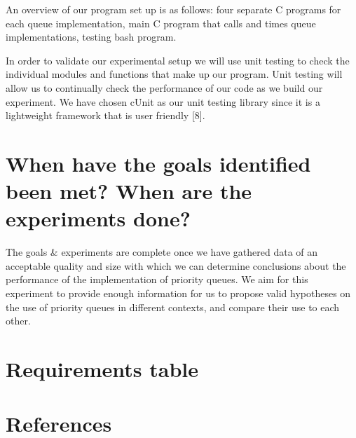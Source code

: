 \documentclass[12pt]{article}
\begin{document}
An overview of our program set up is as follows:  four separate C programs for each queue implementation, main C program that calls and times queue implementations, testing bash program.

In order to validate our experimental setup we will use unit testing to check the individual modules and functions that make up our program. Unit testing will allow us to continually check the performance of our code as we build our experiment. We have chosen cUnit as our unit testing library since it is a lightweight framework that is user friendly [8].


\section{When have the goals identified been met? When are the experiments done?}

The goals \& experiments are complete once we have gathered data of an acceptable quality and size with which we can determine conclusions about the performance of the implementation of priority queues. We aim for this experiment to provide enough information for us to propose valid hypotheses on the use of priority queues in different contexts, and compare their use to each other.

\section{Requirements table}

\section{References}
\end{document}
